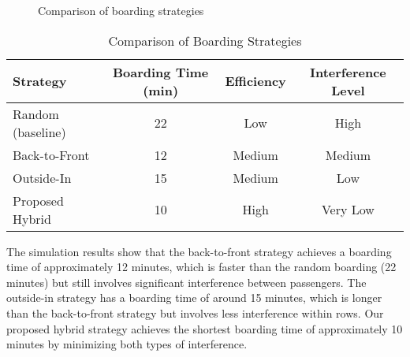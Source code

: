 \documentclass[12pt]{article}
\begin{document}
\begin{figure}[H]
\centering
{}
\caption{Comparison of boarding strategies}
\label{fig:strategy-comparison}
\end{figure}

\begin{table}[H]
\centering
\caption{Comparison of Boarding Strategies}
\begin{tabular}{lccc}
\toprule
\textbf{Strategy} & \textbf{Boarding Time (min)} & \textbf{Efficiency} & \textbf{Interference Level} \\
\midrule
Random (baseline) & 22 & Low & High \\
Back-to-Front & 12 & Medium & Medium \\
Outside-In & 15 & Medium & Low \\
Proposed Hybrid & 10 & High & Very Low \\
\bottomrule
\end{tabular}
\end{table}

The simulation results show that the back-to-front strategy achieves a boarding time of approximately 12 minutes, which is faster than the random boarding (22 minutes) but still involves significant interference between passengers. The outside-in strategy has a boarding time of around 15 minutes, which is longer than the back-to-front strategy but involves less interference within rows. Our proposed hybrid strategy achieves the shortest boarding time of approximately 10 minutes by minimizing both types of interference.
\end{document}
